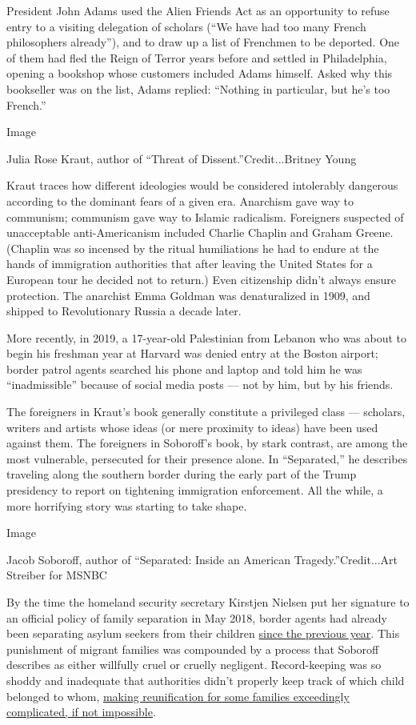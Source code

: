President John Adams used the Alien Friends Act as an opportunity to
refuse entry to a visiting delegation of scholars (``We have had too
many French philosophers already''), and to draw up a list of Frenchmen
to be deported. One of them had fled the Reign of Terror years before
and settled in Philadelphia, opening a bookshop whose customers included
Adams himself. Asked why this bookseller was on the list, Adams replied:
``Nothing in particular, but he's too French.''

Image

Julia Rose Kraut, author of ``Threat of Dissent.''Credit...Britney Young

Kraut traces how different ideologies would be considered intolerably
dangerous according to the dominant fears of a given era. Anarchism gave
way to communism; communism gave way to Islamic radicalism. Foreigners
suspected of unacceptable anti-Americanism included Charlie Chaplin and
Graham Greene. (Chaplin was so incensed by the ritual humiliations he
had to endure at the hands of immigration authorities that after leaving
the United States for a European tour he decided not to return.) Even
citizenship didn't always ensure protection. The anarchist Emma Goldman
was denaturalized in 1909, and shipped to Revolutionary Russia a decade
later.

More recently, in 2019, a 17-year-old Palestinian from Lebanon who was
about to begin his freshman year at Harvard was denied entry at the
Boston airport; border patrol agents searched his phone and laptop and
told him he was ``inadmissible'' because of social media posts --- not
by him, but by his friends.

The foreigners in Kraut's book generally constitute a privileged class
--- scholars, writers and artists whose ideas (or mere proximity to
ideas) have been used against them. The foreigners in Soboroff's book,
by stark contrast, are among the most vulnerable, persecuted for their
presence alone. In ``Separated,'' he describes traveling along the
southern border during the early part of the Trump presidency to report
on tightening immigration enforcement. All the while, a more horrifying
story was starting to take shape.

Image

Jacob Soboroff, author of ``Separated: Inside an American
Tragedy.''Credit...Art Streiber for MSNBC

By the time the homeland security secretary Kirstjen Nielsen put her
signature to an official policy of family separation in May 2018, border
agents had already been separating asylum seekers from their children
\href{https://www.nytimes.com/2018/04/20/us/immigrant-children-separation-ice.html}{since
the previous year}. This punishment of migrant families was compounded
by a process that Soboroff describes as either willfully cruel or
cruelly negligent. Record-keeping was so shoddy and inadequate that
authorities didn't properly keep track of which child belonged to whom,
\href{https://www.newyorker.com/news/news-desk/a-new-report-on-family-separations-shows-the-depths-of-trumps-negligence}{making
reunification for some families exceedingly complicated, if not
impossible}.

